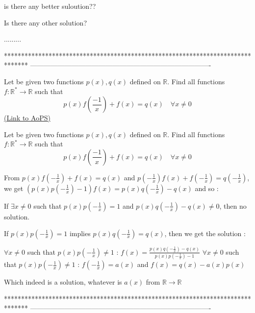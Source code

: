 \begin{solution}
	is there any better suloution??
\end{solution}



\begin{solution}
	Is there any other solution?
\end{solution}



\begin{solution}
	.........
\end{solution}
*******************************************************************************
-------------------------------------------------------------------------------

\begin{problem}
	Let be given two functions $p(x),q(x)$  defined on $ \mathbb R$. Find all functions   $f: \mathbb{ R}^*\to\mathbb R$ such that 
\[p(x)f\left(\frac{-1}{x}\right)+f(x)=q(x)\quad \forall x\neq 0 \]
	\flushright \href{https://artofproblemsolving.com/community/c6h569097}{(Link to AoPS)}
\end{problem}



\begin{solution}
	\begin{tcolorbox}Let be given two functions $p(x),q(x)$  defined on $ \mathbb R$. Find all functions   $f: \mathbb{ R}^*\to\mathbb R$ such that 
\[p(x)f\left(\frac{-1}{x}\right)+f(x)=q(x)\quad \forall x\neq 0 \]\end{tcolorbox}
From $p(x)f(-\frac 1x)+f(x)=q(x)$ and $p(-\frac 1x)f(x)+f(-\frac 1x)=q(-\frac 1x)$, we get $(p(x)p(-\frac 1x)-1)f(x)=p(x)q(-\frac 1x)-q(x)$ and so :

If $\exists x\ne 0$ such that $p(x)p(-\frac 1x)= 1$ and $p(x)q(-\frac 1x)-q(x)\ne 0$, then no solution.

If $p(x)p(-\frac 1x)= 1$ implies $p(x)q(-\frac 1x)=q(x)$, then we get the solution :

$\forall x\ne 0$ such that $p(x)p(-\frac 1x)\ne 1$ : $f(x)=\frac{p(x)q(-\frac 1x)-q(x)}{p(x)p(-\frac 1x)-1}$
$\forall x\ne 0$ such that $p(x)p(-\frac 1x)\ne 1$ : $f(-\frac 1x)=a(x)$ and $f(x)=q(x)-a(x)p(x)$

Which indeed is a solution, whatever is $a(x)$ from $\mathbb R\to\mathbb R$
\end{solution}
*******************************************************************************
-------------------------------------------------------------------------------

